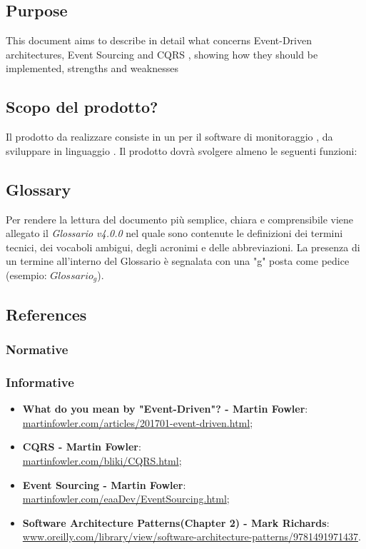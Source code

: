 \subsection{Purpose}
This document aims to describe in detail what concerns Event-Driven architectures, Event Sourcing and CQRS , showing how they should be implemented, strengths and weaknesses
\subsection{Scopo del prodotto?}
Il prodotto da realizzare consiste in un  per il software di monitoraggio , da sviluppare in linguaggio . Il prodotto dovrà svolgere almeno le seguenti funzioni:

\subsection{Glossary}
Per rendere la lettura del documento più semplice, chiara e comprensibile viene allegato il \emph{Glossario v4.0.0} nel quale sono contenute le definizioni dei termini tecnici, dei vocaboli ambigui, degli acronimi e delle abbreviazioni. La presenza di un termine all'interno del Glossario è segnalata con una "g" posta come pedice (esempio: $Glossario_{g}$).

\subsection{References}

\subsubsection{Normative}

\subsubsection{Informative}
\begin{itemize}
	\item \textbf{What do you mean by "Event-Driven"? - Martin Fowler}:\\ \url{martinfowler.com/articles/201701-event-driven.html};
	\item \textbf{CQRS - Martin Fowler}:\\ \url{martinfowler.com/bliki/CQRS.html};
	\item \textbf{Event Sourcing - Martin Fowler}:\\ \url{martinfowler.com/eaaDev/EventSourcing.html};
	\item \textbf{Software Architecture Patterns(Chapter 2) - Mark Richards}: \\
	\url{www.oreilly.com/library/view/software-architecture-patterns/9781491971437}.
\end{itemize}
\pagebreak
